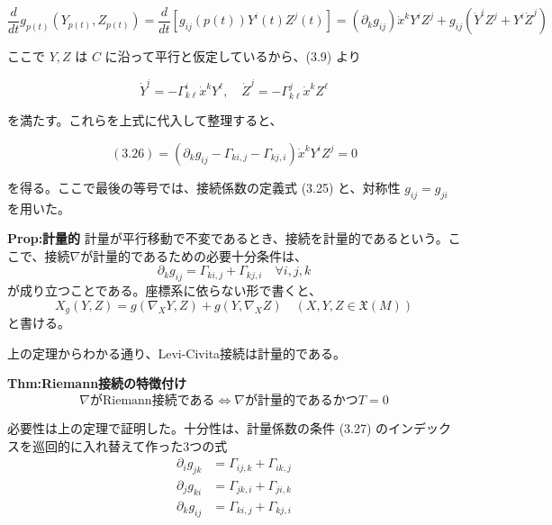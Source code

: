 \documentclass[a4paper,11pt]{jsarticle}
\numberwithin{equation}{section}
\begin{document}
\begin{equation}
    \frac{d}{dt} g_{p(t)} (Y_{p(t)}, Z_{p(t)}) = \frac{d}{dt} [g_{ij}(p(t)) Y^i(t) Z^j(t)] = (\partial_k g_{ij}) \dot{x}^k Y^i Z^j + g_{ij} \left( \dot{Y}^i Z^j + Y^i \dot{Z}^j \right) \tag{3.26}
\end{equation}

ここで $Y, Z$ は $C$ に沿って平行と仮定しているから、(3.9) より

\begin{equation}
    \dot{Y}^i = -\Gamma_{k\ell}^i \dot{x}^k Y^\ell, \quad \dot{Z}^j = -\Gamma_{k\ell}^j \dot{x}^k Z^\ell
\end{equation}

を満たす。これらを上式に代入して整理すると、

\begin{equation}
    (3.26) = (\partial_k g_{ij} - \Gamma_{ki,j} - \Gamma_{kj,i}) \dot{x}^k Y^i Z^j = 0
\end{equation}

を得る。ここで最後の等号では、接続係数の定義式 (3.25) と、対称性 $g_{ij} = g_{ji}$ を用いた。\hfill\qedsymbol

\begin{itembox}[l]{\textbf{Prop:計量的}}
    計量が平行移動で不変であるとき、接続を計量的であるという。ここで、接続$\nabla$が計量的であるための必要十分条件は、
    \begin{equation}
        \partial_k g_{ij} = \Gamma_{ki,j} + \Gamma_{kj,i} \quad \forall i,j,k
    \end{equation}
    が成り立つことである。座標系に依らない形で書くと、
    \begin{equation}
        X_g(Y, Z) = g(\nabla_X Y, Z) + g(Y, \nabla_X Z) \quad (X, Y, Z \in \mathfrak{X}(M))
    \end{equation}
    と書ける。
\end{itembox}
上の定理からわかる通り、Levi-Civita接続は計量的である。\\

\begin{itembox}[l]{\textbf{Thm:Riemann接続の特徴付け}}
    \begin{equation}
        \nabla \text{がRiemann接続である} \Leftrightarrow \nabla \text{が計量的であるかつ} T=0
    \end{equation}

\end{itembox}
必要性は上の定理で証明した。十分性は、計量係数の条件 (3.27) のインデックスを巡回的に入れ替えて作った3つの式
\begin{align}
    \partial_i g_{jk} &= \Gamma_{ij,k} + \Gamma_{ik,j} \\
    \partial_j g_{ki} &= \Gamma_{jk,i} + \Gamma_{ji,k} \\
    \partial_k g_{ij} &= \Gamma_{ki,j} + \Gamma_{kj,i}
\end{align}
\end{document}
